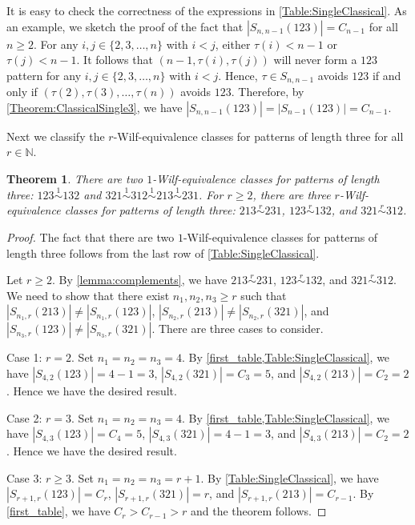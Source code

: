 \documentclass[11pt]{article}
\newtheorem{theorem}{Theorem}[section]
\theoremstyle{definition}
\newcommand{\rsim}{\stackrel{r}{\sim}}
\numberwithin{equation}{section}
\begin{document}
It is easy to check the correctness of the expressions in \cref{Table:SingleClassical}. 
As an example, we sketch the proof of the fact 
that $|S_{n,n-1}(123)|=C_{n-1}$ for all $n\geq2$. For any $i,j\in\{2,3,\ldots,n\}$ with $i<j$, either $\tau(i)<n-1$ or $\tau(j)<n-1$. It follows that $(n-1,\tau(i),\tau(j))$ 
will never form a $123$ pattern for any $i,j\in\{2,3,\ldots,n\}$ with $i<j$. Hence, $\tau\in S_{n,n-1}$ avoids $123$ if and only if $(\tau(2),\tau(3),\ldots,\tau(n))$ avoids $123$. Therefore, by \cref{Theorem:ClassicalSingle3}, we have $|S_{n,n-1}(123)|=|S_{n-1}(123)|=C_{n-1}$.





Next we classify 
the $r$-Wilf-equivalence classes for patterns of length three
for all $r\in\mathbb{N}$.
\begin{theorem}\label{Theorem:rWilf3}
There are two $1$-Wilf-equivalence classes for patterns of length three: $123\stackrel{1}{\sim} 132$ and $321\stackrel{1}{\sim}312\stackrel{1}{\sim}213\stackrel{1}{\sim}231$. 
For $r\geq2$, there are three $r$-Wilf-equivalence classes for patterns of length three: $213\rsim231$, $123\rsim132$, and $321\rsim312$. 
\end{theorem}
\begin{proof}
The fact that there are two $1$-Wilf-equivalence classes for patterns of length three 
follows from the last row of \cref{Table:SingleClassical}.

Let $r\geq2$. By \cref{lemma:complements}, we have $213\rsim231$, $123\rsim132$, and $321\rsim312$. We need to show that there exist $n_1,n_2,n_3\geq r$ such that $|S_{n_1,r}(213)|\neq|S_{n_1,r}(123)|$, $|S_{n_2,r}(213)|\neq|S_{n_2,r}(321)|$, and $|S_{n_3,r}(123)|\neq|S_{n_3,r}(321)|$. There
are three cases to consider. 

Case 1: $r=2$. Set $n_1=n_2=n_3=4$. By \cref{first_table,Table:SingleClassical}, we have $|S_{4,2}(123)|=4-1=3$, $|S_{4,2}(321)|=C_3=5$, and $|S_{4,2}(213)|=C_2=2$. Hence we have the desired result.

Case 2: $r=3$. Set $n_1=n_2=n_3=4$. By \cref{first_table,Table:SingleClassical}, we have $|S_{4,3}(123)|=C_4=5$, $|S_{4,3}(321)|=4-1=3$, and $|S_{4,3}(213)|=C_2=2$. Hence we have the desired result.

Case 3: $r\geq3$. Set $n_1=n_2=n_3=r+1$. By \cref{Table:SingleClassical}, we have 
$|S_{r+1,r}(123)|=C_r$, $|S_{r+1,r}(321)|=r$, and $|S_{r+1,r}(213)|=C_{r-1}$. 
By \cref{first_table}, we have $C_r>C_{r-1}>r$ and the theorem follows.
\end{proof}
\end{document}
